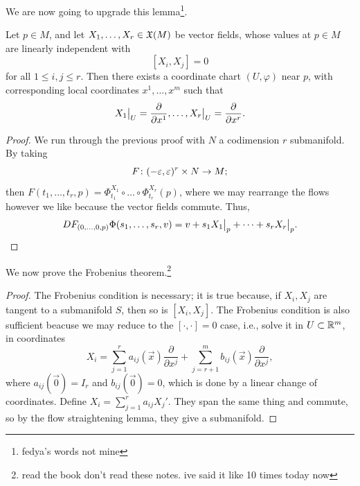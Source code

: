 We are now going to upgrade this lemma\footnote{fedya's words not mine}.
\begin{lemma}
    Let $p \in M$, and let $X_1, \dots, X_r \in \mathfrak X(M)$ be vector fields, whose values at $p \in M$ are linearly independent with
    \[ [X_i, X_j] = 0 \]
    for all $1 \leq i, j \leq r$. Then there exists a coordinate chart $(U, \varphi)$ near $p$, with corresponding local coordinates $x^1, \dots, x^m$ such that
    \[ \restr{X_1}{U} = \frac{\partial}{\partial x^1}, \dots, \restr{X_r}{U} = \frac{\partial}{\partial x^r}. \]
\end{lemma}
\begin{proof}
    We run through the previous proof with $N$ a codimension $r$ submanifold. By taking
    \[ F \colon (-\varepsilon, \varepsilon)^r \times N \to M; \]
    then $F(t_1, \dots, t_r, p) = \Phi_{t_1}^{X_1} \circ \dots \circ \Phi_{t_r}^{X_r}(p)$, where we may rearrange the flows however we like because the vector fields commute. Thus,
    \[ DF_{(0, \dots, 0, p)} \Phi(s_1, \dots, s_r, v) = v + s_1 \restr{X_1}{p} + \dots + s_r \restr{X_r}{p}. \qedhere \]
\end{proof}
We now prove the Frobenius theorem.\footnote{read the book don't read these notes. ive said it like 10 times today now}
\begin{proof}
    The Frobenius condition is necessary; it is true because, if $X_i, X_j$ are tangent to a submanifold $S$, then so is $[X_i, X_j]$. The Frobenius condition is also sufficient beacuse we may reduce to the $[\cdot, \cdot] = 0$ case, i.e., solve it in $U \subset \mathbb R^m$, in coordinates
    \[ X_i = \sum_{j=1}^r a_{ij} (\vec x) \frac{\partial}{\partial x^j} + \sum_{j=r+1}^m b_{ij}(\vec x) \frac{\partial}{\partial x^j}, \]
    where $a_{ij}(\vec 0) = I_r$ and $b_{ij}(\vec 0) = 0$, which is done by a linear change of coordinates. Define $X_i = \sum_{j=1}^r a_{ij} X_j'$. They span the same thing and commute, so by the flow straightening lemma, they give a submanifold.
\end{proof}